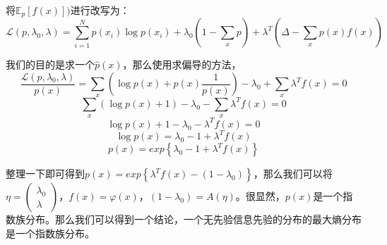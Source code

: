 \documentclass[a4paper]{article}
\begin{document}
将$\mathbb{E}_p[f(x)])$进行改写为：
\begin{equation}
    \mathcal{L}(p,\lambda_0, \lambda) = \sum_{i=1}^N p(x_i)\log p(x_i) + \lambda_0(1-\sum_{x} p)+\lambda^T(\Delta - \sum_x p(x)f(x))
\end{equation}

我们的目的是求一个$\hat{p}(x)$，那么使用求偏导的方法，
\begin{equation}
    \frac{\mathcal{L}(p,\lambda_0, \lambda)}{p(x)}=\sum_x\left( \log p(x) + p(x)\frac{1}{p(x)} \right) - \lambda_0 + \sum_x \lambda^Tf(x) = 0
\end{equation}
\begin{equation}
    \sum_x\left( \log p(x) + 1 \right) - \lambda_0 - \sum_x \lambda^Tf(x) = 0
\end{equation}
\begin{equation}
    \log p(x) + 1 - \lambda_0 - \lambda^Tf(x) = 0
\end{equation}
\begin{equation}
    \log p(x) = \lambda_0 - 1 + \lambda^Tf(x) 
\end{equation}
\begin{equation}
    p(x) = exp\left\{\lambda_0 - 1 + \lambda^Tf(x)\right\} 
\end{equation}

整理一下即可得到$p(x) = exp\left\{\lambda^Tf(x) - ( 1 - \lambda_0) \right\} $，那么我们可以将$\eta = \begin{pmatrix} \lambda_0 \\ \lambda  \end{pmatrix}$，$f(x)=\varphi(x)$，$(1-\lambda_0)=A(\eta)$。很显然，$p(x)$是一个指数族分布。那么我们可以得到一个结论，一个无先验信息先验的分布的最大熵分布是一个指数族分布。
\end{document}
